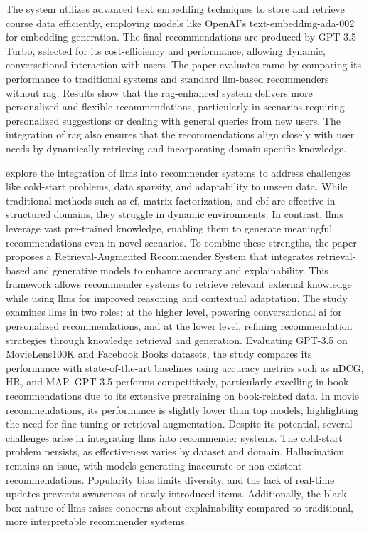 The system utilizes advanced text embedding techniques to store and retrieve course data efficiently, employing models like OpenAI's text-embedding-ada-002 for embedding generation.
The final recommendations are produced by GPT-3.5 Turbo, selected for its cost-efficiency and performance, allowing dynamic, conversational interaction with users.
The paper evaluates \gls{ramo} by comparing its performance to traditional systems and standard \gls{llm}-based recommenders without \gls{rag}.
Results show that the \gls{rag}-enhanced system delivers more personalized and flexible recommendations, particularly in scenarios requiring personalized suggestions or dealing with general queries from new users.
The integration of \gls{rag} also ensures that the recommendations align closely with user needs by dynamically retrieving and incorporating domain-specific knowledge.

\textcite{DiPalma2023} explore the integration of \glspl{llm} into recommender systems to address challenges like cold-start problems, data sparsity, and adaptability to unseen data.
While traditional methods such as \gls{cf}, matrix factorization, and \gls{cbf} are effective in structured domains, they struggle in dynamic environments.
In contrast, \glspl{llm} leverage vast pre-trained knowledge, enabling them to generate meaningful recommendations even in novel scenarios.
To combine these strengths, the paper proposes a Retrieval-Augmented Recommender System that integrates retrieval-based and generative models to enhance accuracy and explainability.
This framework allows recommender systems to retrieve relevant external knowledge while using \glspl{llm} for improved reasoning and contextual adaptation.
The study examines \glspl{llm} in two roles: at the higher level, powering conversational \gls{ai} for personalized recommendations, and at the lower level, refining recommendation strategies through knowledge retrieval and generation.
Evaluating GPT-3.5 on MovieLens100K and Facebook Books datasets, the study compares its performance with state-of-the-art baselines using accuracy metrics such as nDCG, HR, and MAP.
GPT-3.5 performs competitively, particularly excelling in book recommendations due to its extensive pretraining on book-related data.
In movie recommendations, its performance is slightly lower than top models, highlighting the need for fine-tuning or retrieval augmentation.
Despite its potential, several challenges arise in integrating \glspl{llm} into recommender systems.
The cold-start problem persists, as effectiveness varies by dataset and domain.
Hallucination remains an issue, with models generating inaccurate or non-existent recommendations.
Popularity bias limits diversity, and the lack of real-time updates prevents awareness of newly introduced items.
Additionally, the black-box nature of \glspl{llm} raises concerns about explainability compared to traditional, more interpretable recommender systems.

